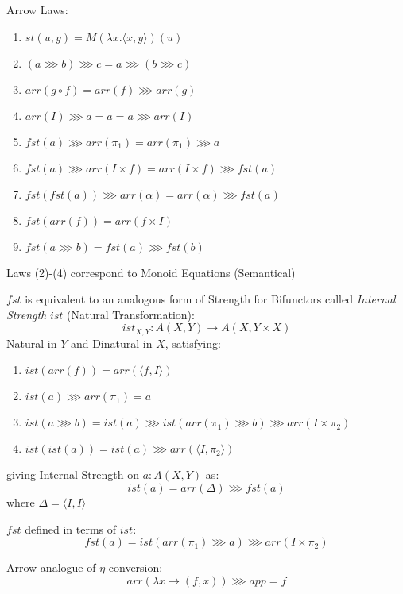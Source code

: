 Arrow Laws:
\begin{enumerate}
  \item $st(u,y) = M(\lambda x.\langle x,y \rangle)(u)$
  \item $(a \ggg b) \ggg c = a \ggg (b \ggg c)$
  \item $arr (g \circ f) = arr(f) \ggg arr(g)$
  \item $arr(I) \ggg a = a = a \ggg arr(I)$
  \item $fst(a) \ggg arr(\pi_1) = arr(\pi_1) \ggg a$
  \item $fst(a) \ggg arr (I \times f) = arr (I \times f) \ggg fst(a)$
  \item $fst (fst(a)) \ggg arr(\alpha) = arr(\alpha) \ggg fst(a)$
  \item $fst (arr(f)) = arr (f \times I)$
  \item $fst (a \ggg b) = fst(a) \ggg fst(b)$
\end{enumerate}
Laws (2)-(4) correspond to Monoid Equations (Semantical)

$fst$ is equivalent to an analogous form of Strength for Bifunctors
called \emph{Internal Strength} $ist$ (Natural Transformation):
\[
  ist_{X,Y} : A(X,Y) \rightarrow A(X,Y \times X)
\]
Natural in $Y$ and Dinatural in $X$, satisfying:
\begin{enumerate}
  \item $ist(arr(f)) = arr(\langle f,I \rangle)$
  \item $ist(a) \ggg arr(\pi_1) = a$
  \item $ist(a \ggg b) = ist(a) \ggg ist(arr(\pi_1) \ggg b) \ggg arr(I
    \times \pi_2)$
  \item $ist(ist(a)) = ist(a) \ggg arr(\langle I, \pi_2 \rangle)$
\end{enumerate}
giving Internal Strength on $a : A(X,Y)$ as:
\[
  ist(a) = arr(\Delta) \ggg fst(a)
\]
where $\Delta = \langle I,I \rangle$

$fst$ defined in terms of $ist$:
\[
  fst(a) = ist(arr(\pi_1) \ggg a) \ggg arr(I \times \pi_2)
\]

Arrow analogue of $\eta$-conversion:\cite{hughes98}
\[
  arr (\lambda x \rightarrow (f,x)) \ggg app = f
\]


